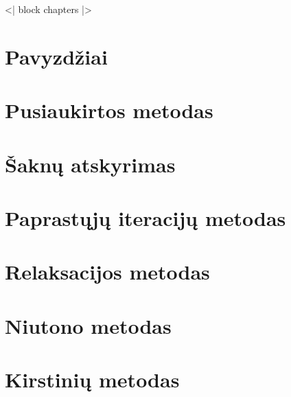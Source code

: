 <| block chapters |>
\newcommand{\cinput}[1]{}


\section{Pavyzdžiai}
\cite[16-18]{textbook}
\section{Pusiaukirtos metodas}
\cite[19-22]{textbook}
\section{Šaknų atskyrimas}
\cite[23-25]{textbook}
\section{Paprastųjų iteracijų metodas}
\cite[26-31]{textbook}
\section{Relaksacijos metodas}
\cite[34-35]{textbook}
\section{Niutono metodas}
\cite[36-39]{textbook}
\section{Kirstinių metodas}
\cite[40-42]{textbook}

